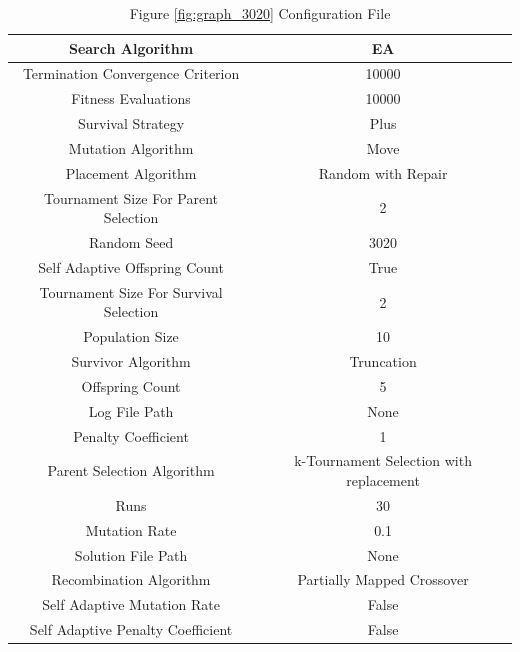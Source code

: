 \documentclass{standalone}
\begin{document}
\begin{table}[!htb]
	\centering
	\caption{Figure \ref{fig:graph_3020} Configuration File}
	\label{tab:graph_3020}
	\begin{tabular}{| c | c |}
		\hline
		Search Algorithm		& EA		 \\
		\hline
		Termination Convergence Criterion		& 10000		 \\
		\hline
		Fitness Evaluations		& 10000		 \\
		\hline
		Survival Strategy		& Plus		 \\
		\hline
		Mutation Algorithm		& Move		 \\
		\hline
		Placement Algorithm		& Random with Repair		 \\
		\hline
		Tournament Size For Parent Selection		& 2		 \\
		\hline
		Random Seed		& 3020		 \\
		\hline
		Self Adaptive Offspring Count		& True		 \\
		\hline
		Tournament Size For Survival Selection		& 2		 \\
		\hline
		Population Size		& 10		 \\
		\hline
		Survivor Algorithm		& Truncation		 \\
		\hline
		Offspring Count		& 5		 \\
		\hline
		Log File Path		& None		 \\
		\hline
		Penalty Coefficient		& 1		 \\
		\hline
		Parent Selection Algorithm		& k-Tournament Selection with replacement		 \\
		\hline
		Runs		& 30		 \\
		\hline
		Mutation Rate		& 0.1		 \\
		\hline
		Solution File Path		& None		 \\
		\hline
		Recombination Algorithm		& Partially Mapped Crossover		 \\
		\hline
		Self Adaptive Mutation Rate		& False		 \\
		\hline
		Self Adaptive Penalty Coefficient		& False		 \\
		\hline
	\end{tabular}
\end{table}
\end{document}

